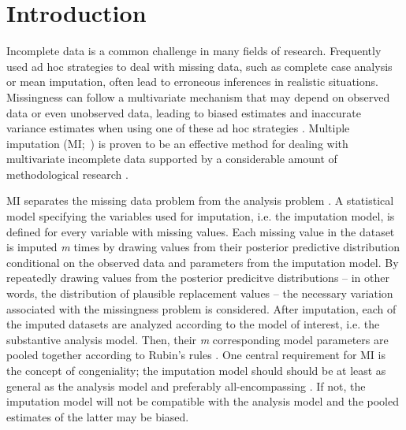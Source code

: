 \documentclass[10pt, a4paper, titlepage]{article}
\begin{document}
\newpage
\tableofcontents
\newpage
\section{Introduction}
Incomplete data is a common challenge in many fields of research. Frequently used ad hoc strategies to deal with missing data, such as complete case analysis or mean imputation, often lead to erroneous inferences in realistic situations. Missingness can follow a multivariate mechanism that may depend on observed data or even unobserved data, leading to biased estimates and inaccurate variance estimates when using one of these ad hoc strategies \citep{buurenFlexibleImputationMissing2018, kang2013, enders2017, austin2021, little2002}. Multiple imputation (MI;~) is proven to be an effective method for dealing with multivariate incomplete data supported by a considerable amount of methodological research \citep{mistlerComparisonJointModel2017, buurenFlexibleImputationMissing2018, enders2017, burgette2010, austin2021, audigier2018, vanbuuren2007, grund2021, hughes2014, little2002}.

MI separates the missing data problem from the analysis problem \citep{mistlerComparisonJointModel2017, buurenFlexibleImputationMissing2018, enders2017, burgette2010, austin2021, audigier2018, vanbuuren2007, grund2021, hughes2014, little2002, carpenter2013, bartlett2015}. A statistical model specifying the variables used for imputation, i.e. the imputation model, is defined for every variable with missing values. Each missing value in the dataset is imputed \textit{m} times by drawing values from their posterior predictive distribution conditional on the observed data and parameters from the imputation model. By repeatedly drawing values from the posterior predicitve distributions -- in other words, the distribution of plausible replacement values -- the necessary variation associated with the missingness problem is considered. After imputation, each of the imputed datasets are analyzed according to the model of interest, i.e. the substantive analysis model. Then, their \textit{m} corresponding model parameters are pooled together according to Rubin's rules \citep{rubin1987}. 
One central requirement for MI is the concept of congeniality; the imputation model should should be at least as general as the analysis model and preferably all-encompassing \citep{grund2018, enders2018, meng1994multiple, bartlett2015, grund2016, little2002}. If not, the imputation model will not be compatible with the analysis model and the pooled estimates of the latter may be biased. 
\end{document}
